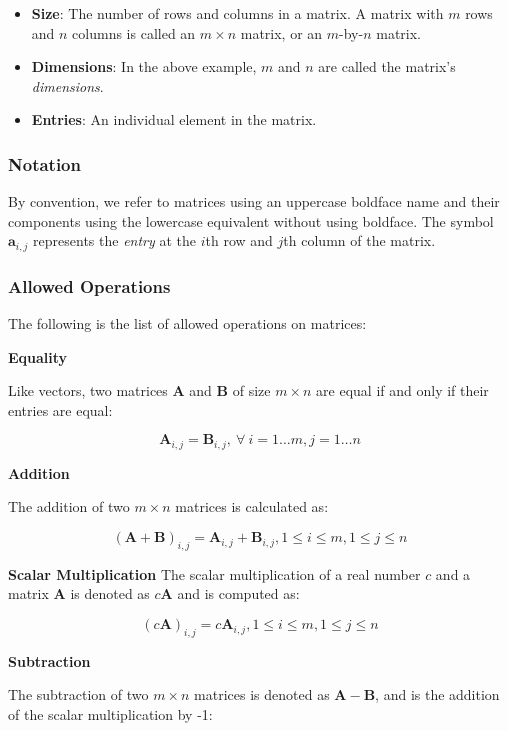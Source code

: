 \documentclass[12pt]{article}
\begin{document}
\begin{itemize}
\item \textbf{Size}: The number of rows and columns in a matrix. A matrix with
      $m$ rows and $n$ columns is called an $m \times n$ matrix, or an $m$-by-$n$ matrix.
\item \textbf{Dimensions}: In the above example, $m$ and $n$ are called the matrix's
      \textit{dimensions}.
\item \textbf{Entries}: An individual element in the matrix.
\end{itemize}

\subsubsection{Notation}

By convention, we refer to matrices using an uppercase boldface name and
their components using the lowercase equivalent without using boldface. The
symbol $\mathbf{a}_{i,j}$ represents the \textit{entry} at the $i$th row
and $j$th column of the matrix.

\subsubsection{Allowed Operations}
The following is the list of allowed operations on matrices:

\medskip
\noindent\textbf{Equality}

Like vectors, two matrices $\mathbf A$ and $\mathbf B$ of size $m \times n$ 
are equal if and only if their entries are equal:

$$\mathbf A_{i,j} = \mathbf B_{i,j},\ \forall~i = 1 \ldots m, j = 1 \ldots n$$

\medskip
\noindent\textbf{Addition}

\noindent The addition of two $m \times n$ matrices is calculated as:

$$(\mathbf A + \mathbf B)_{i,j} = \mathbf{A}_{i,j} + \mathbf{B}_{i,j}, 1 \leq i \leq m, 1 \leq j \leq n$$

\medskip
\noindent\textbf{Scalar Multiplication}
\noindent The scalar multiplication of a real number $c$ and a matrix $\mathbf{A}$ 
is denoted as $c\mathbf{A}$ and is computed as:

$$(c\mathbf A)_{i,j} = c\mathbf{A}_{i,j}, 1 \leq i \leq m, 1 \leq j \leq n$$

\medskip
\noindent\textbf{Subtraction}

\noindent The subtraction of two $m \times n$ matrices is denoted as $\mathbf{A} - \mathbf{B}$,
and is the addition of the scalar multiplication by -1:
\end{document}
